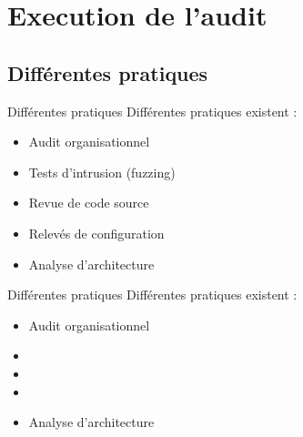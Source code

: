 \documentclass{beamer}
\newcommand{\colorized}[1]{{\color{red}{#1}}}
\begin{document}
\section{Execution de l'audit}	
	\subsection{Différentes pratiques}
		\begin{frame}{Différentes pratiques}
			Différentes pratiques existent : 
			\begin{itemize}
				\item Audit organisationnel
				\item Tests d'intrusion (fuzzing)				
				\item Revue de code source
				\item Relevés de configuration
				\item Analyse d'architecture	
			\end{itemize}		
		\end{frame}
	
		\begin{frame}{Différentes pratiques}
			Différentes pratiques existent : 
			\begin{itemize}
				\item Audit organisationnel
				\item \colorized{Tests d'intrusion (fuzzing)}
				\item \colorized{Revue de code source}
				\item \colorized{Relevés de configuration}
				\item Analyse d'architecture
			\end{itemize}		
		\end{frame}
	
\end{document}

